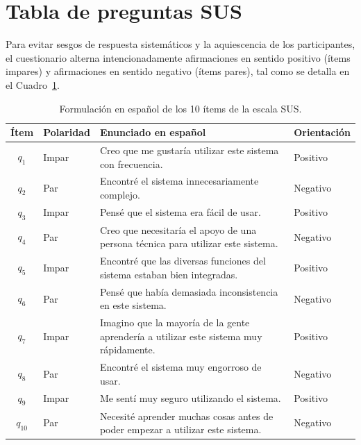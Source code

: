 \documentclass[11pt,a4paper]{article}
\begin{document}
\section{Tabla de preguntas SUS}
Para evitar sesgos de respuesta sistemáticos y la aquiescencia de los participantes, el cuestionario alterna intencionadamente afirmaciones en sentido positivo (ítems impares) y afirmaciones en sentido negativo (ítems pares), tal como se detalla en el Cuadro~\ref{tab:items-sus}.

\begin{table}[htbp]
\centering
\small
\begin{tabular}{clp{9.5cm}l}
\toprule
\textbf{Ítem} & \textbf{Polaridad} & \textbf{Enunciado en español} & \textbf{Orientación} \\
\midrule
$q_1$  & Impar & Creo que me gustaría utilizar este sistema con frecuencia. & Positivo \\
$q_2$  & Par   & Encontré el sistema innecesariamente complejo. & Negativo \\
$q_3$  & Impar & Pensé que el sistema era fácil de usar. & Positivo \\
$q_4$  & Par   & Creo que necesitaría el apoyo de una persona técnica para utilizar este sistema. & Negativo \\
$q_5$  & Impar & Encontré que las diversas funciones del sistema estaban bien integradas. & Positivo \\
$q_6$  & Par   & Pensé que había demasiada inconsistencia en este sistema. & Negativo \\
$q_7$  & Impar & Imagino que la mayoría de la gente aprendería a utilizar este sistema muy rápidamente. & Positivo \\
$q_8$  & Par   & Encontré el sistema muy engorroso de usar. & Negativo \\
$q_9$  & Impar & Me sentí muy seguro utilizando el sistema. & Positivo \\
$q_{10}$ & Par & Necesité aprender muchas cosas antes de poder empezar a utilizar este sistema. & Negativo \\
\bottomrule
\end{tabular}
\caption{Formulación en español de los 10 ítems de la escala SUS.}
\label{tab:items-sus}
\end{table}

\end{document}
